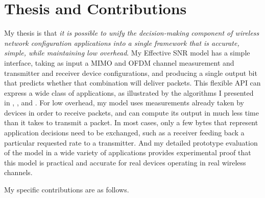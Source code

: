 \section{Thesis and Contributions}
My thesis is that \emph{it is possible to unify the decision-making component of wireless network configuration applications into a single framework that is accurate, simple, while maintaining low overhead}. My Effective SNR model has a simple interface, taking as input a MIMO and OFDM channel measurement and transmitter and receiver device configurations, and producing a single output bit that predicts whether that combination will deliver packets. This flexible API can express a wide class of applications, as illustrated by the algorithms I presented in , , and .  For low overhead, my model uses measurements already taken by devices in order to receive packets, and can compute its output in much less time than it takes to transmit a packet. In most cases, only a few bytes that represent application decisions need to be exchanged, such as a receiver feeding back a particular requested rate to a transmitter. And my detailed prototype evaluation of the model in a wide variety of applications provides experimental proof that this model is practical and accurate for real devices operating in real wireless channels.

My specific contributions are as follows.

